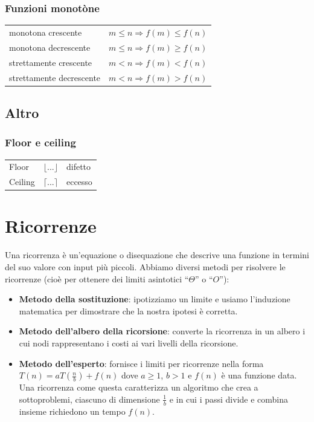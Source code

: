 \documentclass[11pt,a4paper]{article}
\begin{document}
\subsubsection{Funzioni monotòne}
\begin{tabular}{l l}
monotona crescente & $m \leq n \Rightarrow f(m) \leq f(n)$\\
monotona decrescente & $m \leq n \Rightarrow f(m) \geq f(n)$\\
strettamente crescente & $m < n \Rightarrow f(m) < f(n)$\\
strettamente decrescente & $m < n \Rightarrow f(m) > f(n)$
\end{tabular}

\subsection{Altro}
\subsubsection{Floor e ceiling}
\begin{tabular}{l l l}
Floor & $\lfloor ... \rfloor$ & difetto\\
Ceiling & $\lceil ... \rceil$ & eccesso
\end{tabular}

\section{Ricorrenze}
Una ricorrenza è un’equazione o disequazione che descrive una funzione in termini del suo valore con input
più piccoli. Abbiamo diversi metodi per risolvere le ricorrenze (cioè per ottenere dei limiti asintotici “$\Theta$” o “$O$”):
\begin{itemize}
  \item \textbf{Metodo della sostituzione}: ipotizziamo un limite e usiamo l’induzione matematica per dimostrare che la nostra ipotesi è corretta.
  \item \textbf{Metodo dell’albero della ricorsione}: converte la ricorrenza in un albero i cui nodi rappresentano i costi ai vari livelli della ricorsione.
  \item \textbf{Metodo dell’esperto}: fornisce i limiti per ricorrenze nella forma $T(n) = aT(\frac{n}{b}) + f(n)$ dove $a\geq1$, $b>1$ e $f(n)$ è una funzione data. Una ricorrenza come questa caratterizza un algoritmo che crea a sottoproblemi, ciascuno di dimensione $\frac{1}{b}$ e in cui i passi divide e combina insieme richiedono un tempo $f(n)$.
\end{itemize}
\end{document}
